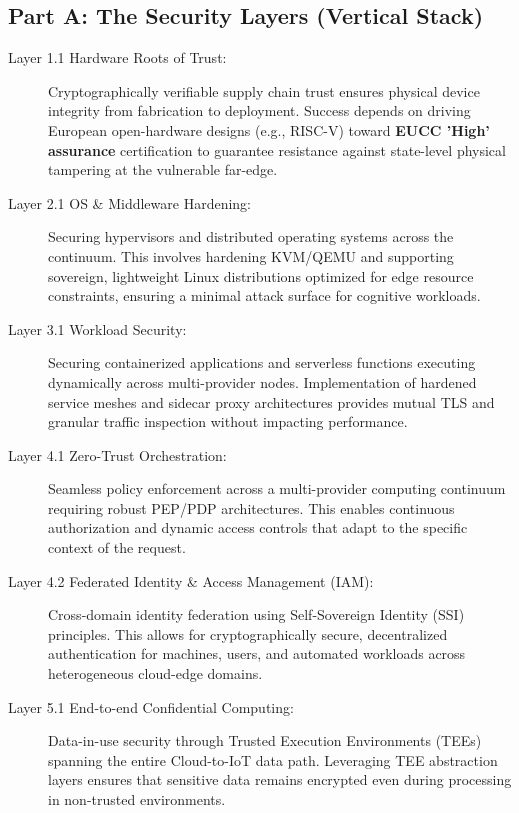 \documentclass[12pt,a4paper]{article}
\begin{document}
\subsection*{Part A: The Security Layers (Vertical Stack)}
\begin{description}
\item[Layer 1.1 Hardware Roots of Trust:] Cryptographically verifiable supply chain trust ensures physical device integrity from fabrication to deployment. Success depends on driving European open-hardware designs (e.g., RISC-V) toward \textbf{EUCC 'High' assurance} certification \cite{eucc} to guarantee resistance against state-level physical tampering at the vulnerable far-edge.

\item[Layer 2.1 OS \& Middleware Hardening:] Securing hypervisors and distributed operating systems across the continuum. This involves hardening KVM/QEMU and supporting sovereign, lightweight Linux distributions optimized for edge resource constraints, ensuring a minimal attack surface for cognitive workloads.

\item[Layer 3.1 Workload Security:] Securing containerized applications and serverless functions executing dynamically across multi-provider nodes. Implementation of hardened service meshes and sidecar proxy architectures provides mutual TLS and granular traffic inspection without impacting performance.

\item[Layer 4.1 Zero-Trust Orchestration:] Seamless policy enforcement across a multi-provider computing continuum requiring robust PEP/PDP architectures. This enables continuous authorization and dynamic access controls that adapt to the specific context of the request.

\item[Layer 4.2 Federated Identity \& Access Management (IAM):] Cross-domain identity federation using Self-Sovereign Identity (SSI) principles. This allows for cryptographically secure, decentralized authentication for machines, users, and automated workloads across heterogeneous cloud-edge domains.

\item[Layer 5.1 End-to-end Confidential Computing:] Data-in-use security through Trusted Execution Environments (TEEs) spanning the entire Cloud-to-IoT data path. Leveraging TEE abstraction layers ensures that sensitive data remains encrypted even during processing in non-trusted environments.


\end{description}
\end{document}
